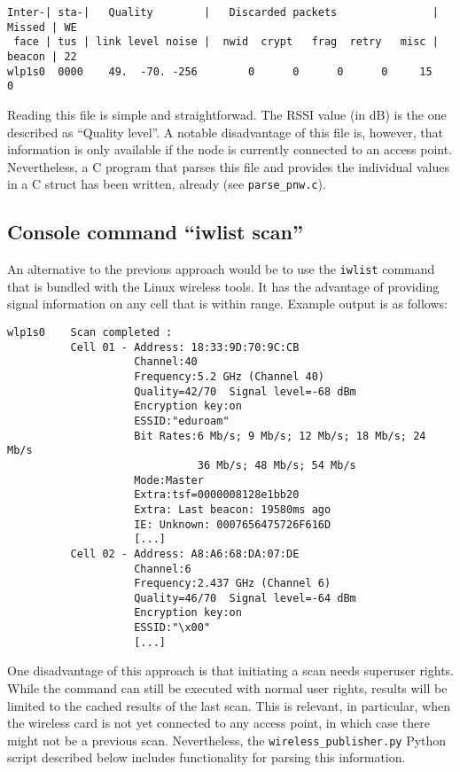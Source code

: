 \documentclass{scrartcl}
\begin{document}
\begin{verbatim}
Inter-| sta-|   Quality        |   Discarded packets               | Missed | WE
 face | tus | link level noise |  nwid  crypt   frag  retry   misc | beacon | 22
wlp1s0  0000    49.  -70. -256        0      0      0      0     15        0
\end{verbatim}

Reading this file is simple and straightforwad. The RSSI value (in dB) is the
one described as ``Quality level''. A notable disadvantage of this file is,
however, that information is only available if the node is currently connected
to an access point. Nevertheless, a C program that parses this file and
provides the individual values in a C struct has been written, already
(see \verb#parse_pnw.c#). 


\subsection*{Console command ``iwlist scan''}

An alternative to the previous approach would be to use the \verb#iwlist#
command that is bundled with the Linux wireless tools. It has the advantage
of providing signal information on any cell that is within range. Example output
is as follows:

\begin{verbatim}
wlp1s0    Scan completed :
          Cell 01 - Address: 18:33:9D:70:9C:CB
                    Channel:40
                    Frequency:5.2 GHz (Channel 40)
                    Quality=42/70  Signal level=-68 dBm  
                    Encryption key:on
                    ESSID:"eduroam"
                    Bit Rates:6 Mb/s; 9 Mb/s; 12 Mb/s; 18 Mb/s; 24 Mb/s
                              36 Mb/s; 48 Mb/s; 54 Mb/s
                    Mode:Master
                    Extra:tsf=0000008128e1bb20
                    Extra: Last beacon: 19580ms ago
                    IE: Unknown: 0007656475726F616D
                    [...]
          Cell 02 - Address: A8:A6:68:DA:07:DE
                    Channel:6
                    Frequency:2.437 GHz (Channel 6)
                    Quality=46/70  Signal level=-64 dBm  
                    Encryption key:on
                    ESSID:"\x00"
                    [...]
\end{verbatim}

One disadvantage of this approach is that initiating a scan needs superuser
rights. While the command can still be executed with normal user rights,
results will be limited to the cached results of the last scan. This is
relevant, in particular, when the wireless card is not yet connected to any
access point, in which case there might not be a previous scan.  Nevertheless,
the \verb#wireless_publisher.py# Python script described below includes
functionality for parsing this information.
\end{document}
